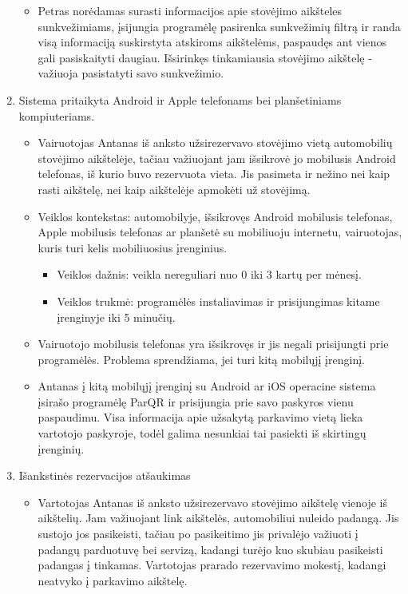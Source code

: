 \documentclass{VUMIFPSkursinis}
\begin{document}
\begin{enumerate}[label = \textbf{PV\arabic*.}]
\begin{itemize}[label={-}]
			\item Petras norėdamas surasti informacijos apie stovėjimo aikšteles sunkvežimiams, įsijungia programėlę pasirenka sunkvežimių filtrą ir randa visą informaciją suskirstyta atskiroms aikštelėms, paspaudęs ant vienos gali pasiskaityti daugiau. Išsirinkęs tinkamiausia stovėjimo aikštelę - važiuoja pasistatyti savo sunkvežimio.
			
		\end{itemize}
	\item Sistema pritaikyta Android ir Apple telefonams bei planšetiniams kompiuteriams.
		\begin{itemize}[label={-}]
			\item Vairuotojas Antanas iš anksto užsirezervavo stovėjimo vietą automobilių stovėjimo aikštelėje, tačiau važiuojant jam išsikrovė jo mobilusis Android telefonas, iš kurio buvo rezervuota vieta. Jis pasimeta ir nežino nei kaip rasti aikštelę, nei kaip aikštelėje apmokėti už stovėjimą.

			\item Veiklos kontekstas: automobilyje, išsikrovęs Android mobilusis telefonas, Apple mobilusis telefonas ar planšetė su mobiliuoju internetu, vairuotojas, kuris turi kelis mobiliuosius įrenginius.
				\begin{itemize}[label={$\bullet$}]
					\item Veiklos dažnis: veikla nereguliari nuo 0 iki 3 kartų per mėnesį.
					\item Veiklos trukmė: programėlės instaliavimas ir prisijungimas kitame įrenginyje iki 5 minučių.
				\end{itemize}
			\item Vairuotojo mobilusis telefonas yra išsikrovęs ir jis negali prisijungti prie programėlės. Problema sprendžiama, jei turi kitą mobilųjį įrenginį.

			\item Antanas į kitą mobilųjį įrenginį su Android ar iOS operacine sistema įsirašo programėlę ParQR ir prisijungia prie savo paskyros vienu paspaudimu. Visa informacija apie užsakytą parkavimo vietą lieka vartotojo paskyroje, todėl galima nesunkiai tai pasiekti iš skirtingų įrenginių.
			
		\end{itemize}
	\item Išankstinės rezervacijos atšaukimas
		\begin{itemize}[label={-}]
			\item Vartotojas Antanas iš anksto užsirezervavo stovėjimo aikštelę vienoje iš aikštelių. Jam važiuojant link aikštelės, automobiliui nuleido padangą. Jis sustojo jos pasikeisti, tačiau po pasikeitimo jis privalėjo važiuoti į padangų parduotuvę bei servizą, kadangi turėjo kuo skubiau pasikeisti padangas į tinkamas. Vartotojas prarado rezervavimo mokestį, kadangi neatvyko į parkavimo aikštelę.


\end{itemize}
\end{enumerate}
\end{document}

